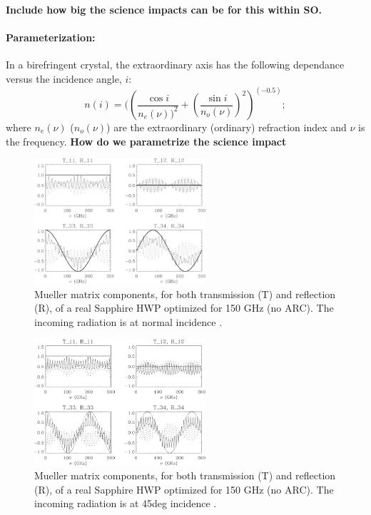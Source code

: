 \textbf{Include how big the science impacts can be for this within SO.}

\paragraph{Parameterization:}
In a birefringent crystal, the extraordinary axis has the following dependance versus the incidence angle, $i$:
\begin{equation}
n(i)=((\frac{\cos{i}}{n_e(\nu))^2}+(\frac{\sin{i}}{n_o(\nu)})^2)^{(-0.5)};
\end{equation}
where $n_e(\nu)$ ($n_o(\nu)$) are the extraordinary (ordinary) refraction index and $\nu$ is the frequency. \textbf{How do we parametrize the science impact}

\begin{figure}
\centering
\includegraphics[width=2.5in]{figures/0deg.png}
\caption{Mueller matrix components, for both transmission (T) and reflection (R), of a real Sapphire HWP
optimized for 150 GHz (no ARC). The incoming radiation is at normal incidence \cite{Salatino17}.
}\label{0deg}
\end{figure}

\begin{figure}
\centering
\includegraphics[width=2.5in]{figures/45deg.png}
\caption{Mueller matrix components, for both transmission (T) and reflection (R), of a real Sapphire HWP
optimized for 150 GHz (no ARC). The incoming radiation is at 45deg incidence \cite{Salatino17}.}\label{45deg}
\end{figure}

